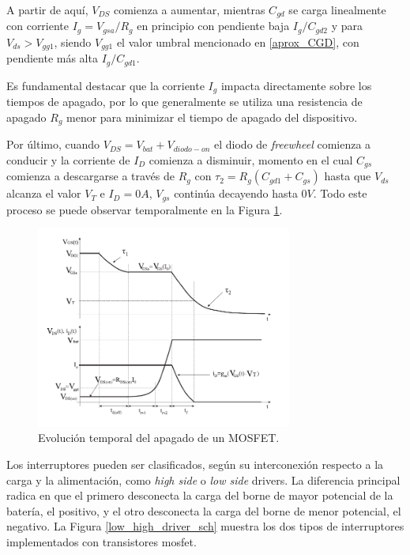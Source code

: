 \documentclass[10pt, a4paper]{report}
\begin{document}
A partir de aquí, $V_{DS}$ comienza a aumentar, mientras $C_{gd}$ se carga
linealmente con corriente $I_g=V_{gsa}/R_g$ en principio con pendiente baja
$I_g/C_{gd2}$ y para $V_{ds} > V_{gg1}$, siendo $V_{gg1}$ el valor umbral
mencionado en \ref{aprox_CGD}, con pendiente más alta $I_g/C_{gd1}$.

Es fundamental destacar que la corriente $I_g$ impacta directamente sobre los
tiempos de apagado, por lo que generalmente se utiliza una resistencia de
apagado $R_g$ menor para minimizar el tiempo de apagado del dispositivo.

Por último, cuando $V_{DS} = V_{bat} + V_{diodo-on} $ el diodo de
\emph{freewheel} comienza a conducir y la corriente de $I_D$ comienza a
disminuir, momento en el cual $C_{gs}$ comienza a descargarse a través de $R_g$
con $\tau_2 = R_g (C_{gd1}+C_{gs})$ hasta que $V_{ds}$ alcanza el valor $V_T$ e
$I_D = 0A$, $V_{gs}$ continúa decayendo hasta $0V$. Todo este proceso se puede
observar temporalmente en la Figura \ref{apagado_time}.

\begin{figure}[h!]
	\begin{center}
		\includegraphics[width=0.75\textwidth]{shutdown_time.pdf}
		\caption{Evolución temporal del apagado de un MOSFET.}
		\label{apagado_time}
	\end{center}
\end{figure}
\FloatBarrier

Los interruptores pueden ser clasificados, según su interconexión respecto a la
carga y la alimentación, como \emph{high side} o \emph{low side} drivers. 
La diferencia principal radica en que el primero desconecta la
carga del borne de mayor potencial de la batería, el positivo, y el otro
desconecta la carga del borne de menor potencial, el negativo. La Figura
\ref{low_high_driver_sch} muestra los dos tipos de interruptores implementados
con transistores mosfet.
\end{document}
